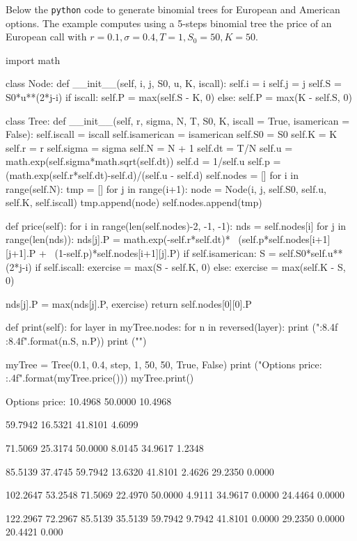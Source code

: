 Below the \texttt{python} code to generate binomial trees for European and American options.
The example computes using a 5-steps binomial tree the price of an European call with $r=0.1, \sigma=0.4, T=1, S_0=50, K=50$.

\begin{ipython}
import math

class Node:
    def __init__(self, i, j, S0, u, K, iscall):
        self.i = i
        self.j = j
        self.S = S0*u**(2*j-i)
        if iscall:
            self.P = max(self.S - K, 0)
        else:
            self.P = max(K - self.S, 0)
        
class Tree:
    def __init__(self, r, sigma, N, T, S0, K, iscall = True, isamerican = False):
        self.iscall = iscall
        self.isamerican = isamerican
        self.S0 = S0
        self.K = K
        self.r = r
        self.sigma = sigma
        self.N = N + 1
        self.dt = T/N
        self.u = math.exp(self.sigma*math.sqrt(self.dt))
        self.d = 1/self.u
        self.p = (math.exp(self.r*self.dt)-self.d)/(self.u - self.d)
        self.nodes = []
        for i in range(self.N):
            tmp = []
            for j in range(i+1):
                node = Node(i, j, self.S0, self.u, self.K, self.iscall)
                tmp.append(node)
            self.nodes.append(tmp)
            
    def price(self):
        for i in range(len(self.nodes)-2, -1, -1):
            nds = self.nodes[i]
            for j in range(len(nds)):
                nds[j].P = math.exp(-self.r*self.dt)* \
                                (self.p*self.nodes[i+1][j+1].P + \
                                (1-self.p)*self.nodes[i+1][j].P)
                if self.isamerican:
                    S = self.S0*self.u**(2*j-i)
                    if self.iscall:
                        exercise = max(S - self.K, 0)
                    else:
                        exercise = max(self.K - S, 0)

                    nds[j].P = max(nds[j].P, exercise)
        return self.nodes[0][0].P
            
    def print(self):
        for layer in myTree.nodes:
            for n in reversed(layer):
                print ("{:8.4f} {:8.4f}".format(n.S, n.P)) 
            print ("")

myTree = Tree(0.1, 0.4, step, 1, 50, 50, True, False)    
print ("Options price: {:.4f}".format(myTree.price()))
myTree.print()
\end{ipython}
\begin{ioutput}
Options price: 10.4968
 50.0000  10.4968

 59.7942  16.5321
 41.8101   4.6099

 71.5069  25.3174
 50.0000   8.0145
 34.9617   1.2348

 85.5139  37.4745
 59.7942  13.6320
 41.8101   2.4626
 29.2350   0.0000

102.2647  53.2548
 71.5069  22.4970
 50.0000   4.9111
 34.9617   0.0000
 24.4464   0.0000

122.2967  72.2967
 85.5139  35.5139
 59.7942   9.7942
 41.8101   0.0000
 29.2350   0.0000
 20.4421   0.000
\end{ioutput}


